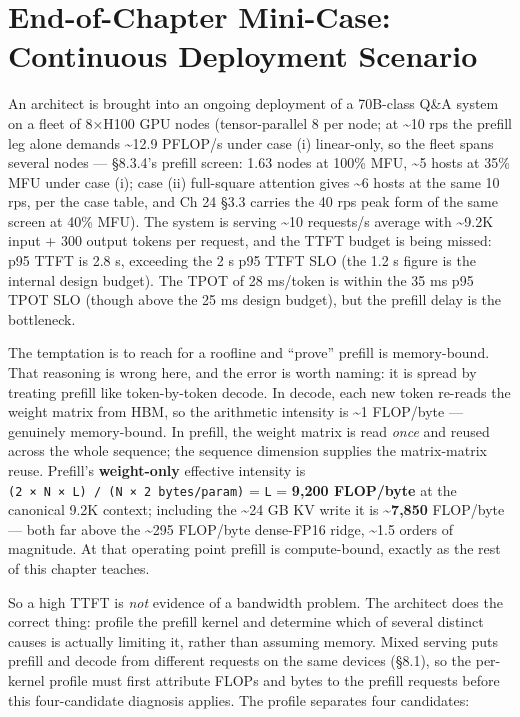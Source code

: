 \section{End-of-Chapter Mini-Case: Continuous Deployment
Scenario}\label{end-of-chapter-mini-case-continuous-deployment-scenario}

An architect is brought into an ongoing deployment of a 70B-class Q\&A
system on a fleet of 8×H100 GPU nodes (tensor-parallel 8 per node; at
\textasciitilde10 rps the prefill leg alone demands \textasciitilde12.9
PFLOP/s under case (i) linear-only, so the fleet spans several nodes ---
§8.3.4's prefill screen: 1.63 nodes at 100\% MFU, \textasciitilde5 hosts
at 35\% MFU under case (i); case (ii) full-square attention gives
\textasciitilde6 hosts at the same 10 rps, per the case table, and Ch 24
§3.3 carries the 40 rps peak form of the same screen at 40\% MFU). The
system is serving \textasciitilde10 requests/s average with
\textasciitilde9.2K input + 300 output tokens per request, and the TTFT
budget is being missed: p95 TTFT is 2.8 s, exceeding the 2 s p95 TTFT
SLO (the 1.2 s figure is the internal design budget). The TPOT of 28
ms/token is within the 35 ms p95 TPOT SLO (though above the 25 ms design
budget), but the prefill delay is the bottleneck.

The temptation is to reach for a roofline and ``prove'' prefill is
memory-bound. That reasoning is wrong here, and the error is worth
naming: it is spread by treating prefill like token-by-token decode. In
decode, each new token re-reads the weight matrix from HBM, so the
arithmetic intensity is \textasciitilde1 FLOP/byte --- genuinely
memory-bound. In prefill, the weight matrix is read \emph{once} and
reused across the whole sequence; the sequence dimension supplies the
matrix-matrix reuse. Prefill's \textbf{weight-only} effective intensity
is \texttt{(2\ ×\ N\ ×\ L)\ /\ (N\ ×\ 2\ bytes/param)} = \texttt{L} =
\textbf{9,200 FLOP/byte} at the canonical 9.2K context; including the
\textasciitilde24 GB KV write it is \textasciitilde{}\textbf{7,850}
FLOP/byte --- both far above the \textasciitilde295 FLOP/byte dense-FP16
ridge, \textasciitilde1.5 orders of magnitude. At that operating point
prefill is compute-bound, exactly as the rest of this chapter teaches.

So a high TTFT is \emph{not} evidence of a bandwidth problem. The
architect does the correct thing: profile the prefill kernel and
determine which of several distinct causes is actually limiting it,
rather than assuming memory. Mixed serving puts prefill and decode from
different requests on the same devices (§8.1), so the per-kernel profile
must first attribute FLOPs and bytes to the prefill requests before this
four-candidate diagnosis applies. The profile separates four candidates:

